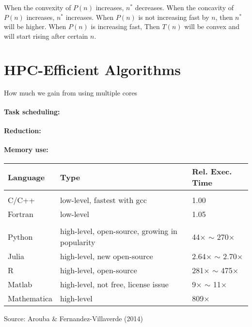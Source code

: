 \documentclass[12pt]{article}
\begin{document}
When the convexity of $P(n)$ increases, $n^*$ decreases. When the concavity of $P(n)$ increases,
$n^*$ increases. When $P(n)$ is not increasing fast by $n$, then $n^*$ will be higher. When $P(n)$ is increasing fast, Then $T(n)$ will be convex and will start rising after certain $n$.


\clearpage
\section{HPC-Efficient Algorithms}
How much we gain from using multiple cores
\paragraph{Task scheduling:}
\paragraph{Reduction:}
\paragraph{Memory use:}





\begin{table}[h!]
\begin{tabular}{p{2cm} | p{5cm} | p{3cm}}
\hline
Language & Type & Rel. Exec. Time\\[0.1em]
\hline \hline
&&\\[-0.8em]
C/C++ 	& low-level, fastest with gcc & 1.00 \\[0.2em]
Fortran & low-level  & 1.05 \\[0.2em] 
\hline
&&\\[-0.8em]
Python 	& high-level, open-source, growing in popularity & 44$\times$ $\sim$ 270$\times$ \\[0.2em]
Julia 	& high-level, new open-source & 2.64$\times$ $\sim$ 2.70$\times$ \\[0.2em]
R & high-level, open-source & 281$\times$ $\sim$ 475$\times$ \\[0.2em]
Matlab & high-level, not free, license issue & 9$\times$ $\sim$ 11$\times$ \\[0.2em]
Mathematica & high-level & 809$\times$ \\[0.2em]
\hline
\end{tabular}
\end{table}
\vspace{-0.8em}
\hspace{1em}\scriptsize{Source: Arouba \& Fernandez-Villaverde (2014)}
\end{document}
